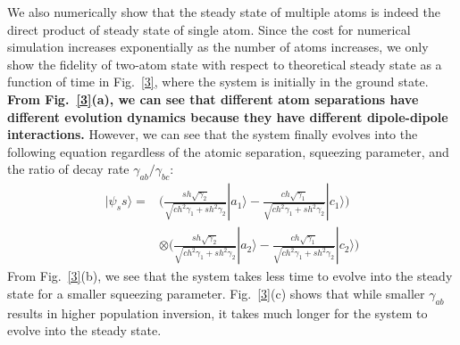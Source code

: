 \documentclass[aps,showpacs,twocolumn,twoside,groupedaddress]{revtex4}
\begin{document}
We also numerically show that the steady state of multiple atoms is indeed the direct product of steady state of single atom. Since the cost for numerical simulation increases exponentially as the number of atoms increases, we only show the fidelity of two-atom state with respect to theoretical steady state as a function of time in Fig.~\ref{3}, where the system is initially in the ground state. \textbf{From Fig.~\ref{3}(a), we can see that different atom separations have different evolution dynamics because they have different dipole-dipole interactions.} However,  we can see that the system finally evolves into the following equation regardless of the atomic separation, squeezing parameter, and the ratio of decay rate $\gamma_{ab}/\gamma_{bc}$: 
\begin{equation}
\begin{split}
|\psi_ss\rangle = & \ensuremath{\Big(\frac{sh\sqrt{\gamma_{2}}}{\sqrt{ch^{2}\gamma_{1}+sh^{2}\gamma_{2}}}|a_{1}\rangle-\frac{ch\sqrt{\gamma_{1}}}{\sqrt{ch^{2}\gamma_{1}+sh^{2}\gamma_{2}}}|c_{1}\rangle}\Big)\\ &\otimes\Big(\frac{sh\sqrt{\gamma_{2}}}{\sqrt{ch^{2}\gamma_{1}+sh^{2}\gamma_{2}}}|a_{2}\rangle-\frac{ch\sqrt{\gamma_{1}}}{\sqrt{ch^{2}\gamma_{1}+sh^{2}\gamma_{2}}}|c_{2}\rangle\Big)
\end{split}
\end{equation}
From Fig.~\ref{3}(b), we see that the system takes less time to evolve into the steady state for a smaller squeezing parameter. Fig.~\ref{3}(c) shows that while smaller $\gamma_{ab}$ results in higher population inversion, it takes much longer for the system to evolve into the steady state.
\end{document}
